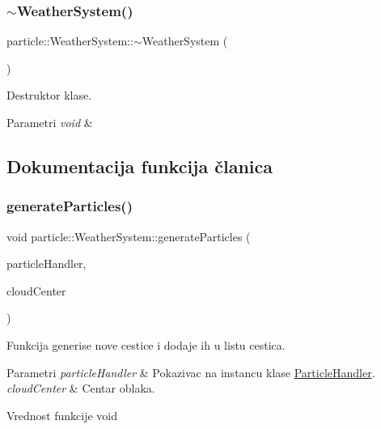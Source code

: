 \subsubsection{\texorpdfstring{$\sim$\+Weather\+System()}{~WeatherSystem()}}
{\footnotesize\ttfamily particle\+::\+Weather\+System\+::$\sim$\+Weather\+System (\begin{DoxyParamCaption}{ }\end{DoxyParamCaption})}



Destruktor klase. 


\begin{DoxyParams}{Parametri}
{\em void} & \\
\hline
\end{DoxyParams}


\subsection{Dokumentacija funkcija članica}
\mbox{\label{classparticle_1_1WeatherSystem_ac26bba944fcc147b49f12df6d11b53e5}} 
\subsubsection{\texorpdfstring{generate\+Particles()}{generateParticles()}}
{\footnotesize\ttfamily void particle\+::\+Weather\+System\+::generate\+Particles (\begin{DoxyParamCaption}\item[{\hyperlink{classparticle_1_1ParticleHandler}{Particle\+Handler} $\ast$}]{particle\+Handler,  }\item[{vec3}]{cloud\+Center }\end{DoxyParamCaption})}



Funkcija generise nove cestice i dodaje ih u listu cestica. 


\begin{DoxyParams}{Parametri}
{\em particle\+Handler} & Pokazivac na instancu klase \hyperlink{classparticle_1_1ParticleHandler}{Particle\+Handler}. \\
\hline
{\em cloud\+Center} & Centar oblaka. \\
\hline
\end{DoxyParams}
\begin{DoxyReturn}{Vrednost funkcije}
void 
\end{DoxyReturn}
\mbox{\label{classparticle_1_1WeatherSystem_aba0914ccb5a062a4b7d54c17d107c543}} 
